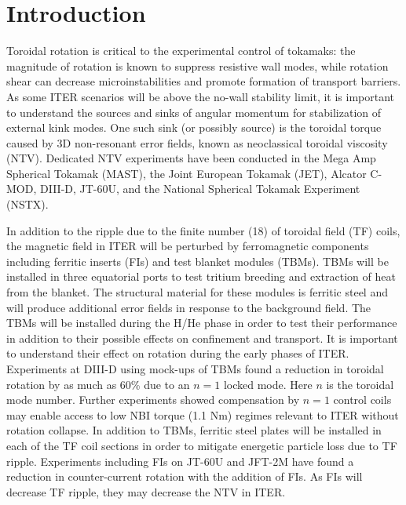 \documentclass[aip, pop, preprint]{revtex4-1}
\numberwithin{figure}{section}
\numberwithin{equation}{section}
\begin{document}
\maketitle

\section{Introduction}

Toroidal rotation is critical to the experimental control of tokamaks: the magnitude of rotation is known to suppress resistive wall modes,\cite{Bondeson1994, Garofalo2002} while rotation shear can decrease microinstabilities and promote formation of transport barriers.\cite{Burrell1997, Terry2000} As some ITER scenarios will be above the no-wall stability limit,\cite{Liu2004} it is important to understand the sources and sinks of angular momentum for stabilization of external kink modes. One such sink (or possibly source) is the toroidal torque caused by 3D non-resonant error fields, known as neoclassical toroidal viscosity (NTV). Dedicated NTV experiments have been conducted in the Mega Amp Spherical Tokamak (MAST),\cite{Hua2010} the Joint European Tokamak (JET),\cite{Lazzaro2002, DeVries2008b} Alcator C-MOD,\cite{Wolfe2005}  DIII-D,\cite{Garofalo2008,Reimerdes2009} JT-60U,\cite{Honda2014} and the National Spherical Tokamak Experiment (NSTX).\cite{Zhu2006} 

In addition to the ripple due to the finite number (18) of toroidal field (TF) coils, the magnetic field in ITER will be perturbed by ferromagnetic components including ferritic inserts (FIs) and test blanket modules (TBMs). TBMs will be installed in three equatorial ports to test tritium breeding and extraction of heat from the blanket. The structural material for these modules is ferritic steel and will produce additional error fields in response to the background field. The TBMs will be installed during the H/He phase in order to test their performance in addition to their possible effects on confinement and transport.\cite{Chuyanov2010} It is important to understand their effect on rotation during the early phases of ITER. Experiments at DIII-D using mock-ups of TBMs found a reduction in toroidal rotation by as much as 60\% due to an $n = 1$ locked mode.\cite{Schaffer2011} Here $n$ is the toroidal mode number. Further experiments showed compensation by $n=1$ control coils may enable access to low NBI torque (1.1 Nm) regimes relevant to ITER without rotation collapse.\cite{Lanctot2017} In addition to TBMs, ferritic steel plates will be installed in each of the TF coil sections in order to mitigate energetic particle loss due to TF ripple.\cite{Tobita2003} Experiments including FIs on JT-60U\cite{Urano2007} and JFT-2M\cite{Kawashima2001} have found a reduction in counter-current rotation with the addition of FIs. As FIs will decrease TF ripple, they may decrease the NTV in ITER.
\end{document}
